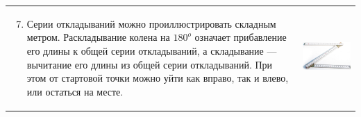 \begin{tabular}{ll}
\begin{minipage}{0.6\linewidth}
\begin{enumerate}\setcounter{enumi}{6}
\item Серии откладываний можно проиллюстрировать складным метром. Раскладывание колена на $180^o$ означает прибавление его длины к общей серии откладываний, а складывание --- вычитание его длины из общей серии откладываний. При этом от стартовой точки можно уйти как вправо, так и влево, или остаться на месте.
\end{enumerate}
\end{minipage}
&
\begin{minipage}{0.4\linewidth}
\includegraphics[scale=0.3]{meter.png}
\end{minipage}
\end{tabular}
